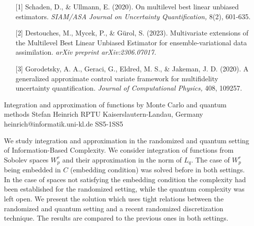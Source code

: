 \begin{talk}
\medskip

\begin{enumerate}
    \item[{[1]}] Schaden, D., \& Ullmann, E. (2020). On multilevel best linear unbiased estimators. \textit{SIAM/ASA Journal on Uncertainty Quantification,} 8(2), 601-635.
    \item[{[2]}] Destouches, M., Mycek, P., \& Gürol, S. (2023). Multivariate extensions of the Multilevel Best Linear Unbiased Estimator for ensemble-variational data assimilation. \textit{arXiv preprint arXiv:2306.07017.}
    \item[{[3]}] Gorodetsky, A. A., Geraci, G., Eldred, M. S., \& Jakeman, J. D. (2020). A generalized approximate control variate framework for multifidelity uncertainty quantification. \textit{Journal of Computational Physics,} 408, 109257.
\end{enumerate}


\end{talk}

\begin{talk}
  {Integration and approximation of functions by Monte Carlo and quantum\\ methods}%
  {Stefan Heinrich}%
  {RPTU Kaiserslautern-Landau, Germany}
{heinrich@informatik.uni-kl.de}
{}
{}{}{SS5-1}{SS5}

			

We study integration and approximation in the randomized and quantum setting of Informa\-tion-Based Complexity. 
We consider integration  of functions from Sobolev spaces $W_p^r$ and their approximation in the norm of $L_q$. The case of $W_p^r$ being embedded in $C$ (embedding condition) was solved before in both settings. 
In the case of spaces not satisfying the embedding condition the complexity had been established for the randomized setting, while the quantum complexity was left open. We present the solution which uses tight relations between the randomized and quantum setting and a recent randomized discretization technique. The results are compared to the previous ones in both settings.


\end{talk}

